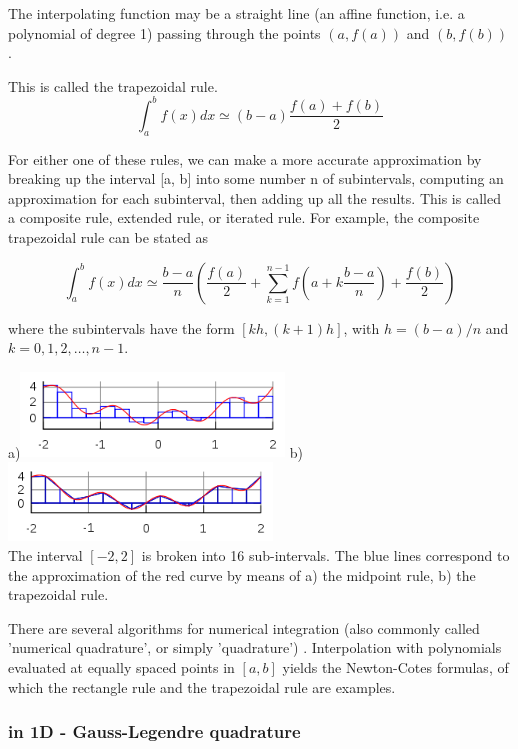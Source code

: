 The interpolating function may be a straight line (an affine function, i.e. a polynomial of degree 1)
passing through the points $(a, f(a))$ and $(b, f(b))$.

This is called the trapezoidal rule.  
\[
\int_a^b f(x)dx \simeq (b-a) \frac{f(a)+f(b)}{2}
\]


For either one of these rules, we can make a more accurate approximation by breaking up the interval [a, b] into some number n of subintervals, computing an approximation for each subinterval, then adding up all the results. This is called a composite rule, extended rule, or iterated rule. For example, the composite trapezoidal rule can be stated as

\[
\int_a^b f(x)dx \simeq \frac{b-a}{n} \left( \frac{f(a)}{2}  
+\sum_{k=1}^{n-1} f(a+k\frac{b-a}{n})
   +\frac{f(b)}{2} \right)
\]

where the subintervals have the form $[kh,(k+1)h]$, with $h=(b-a)/n$ and $k=0,1,2,\dots,n-1$.


\begin{center}
a)\includegraphics[width=7cm]{images/quadrature/int1}
b)\includegraphics[width=7cm]{images/quadrature/int2}\\
The interval $[-2,2]$ is broken into 16 sub-intervals. The blue lines correspond to the 
approximation of the red curve by means of a) the midpoint rule,  b) the trapezoidal rule.
\end{center}

There are several algorithms for numerical integration (also commonly called 'numerical quadrature', or
simply 'quadrature') .
Interpolation with polynomials evaluated at equally spaced points in $[a,b]$
yields the Newton-Cotes formulas, of which the rectangle rule and the trapezoidal rule are examples. 

\subsubsection{in 1D - Gauss-Legendre quadrature  \label{sec:quad1Dglq}}

